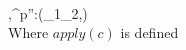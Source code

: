 \\[0.2cm]
	{\Gamma,\Pi\vdash [c\;e_1^{p} \; e_2^{p'}]^{p''}:(\delta_1\cup\delta_2,\emptyset)}\\[0.3cm]
	Where $apply(c)$ is defined
